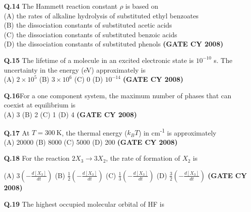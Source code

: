 \documentclass[12pt]{article}
\begin{document}
\begin{enumerate}
    \vspace{0.5cm}

    \textbf{Q.14} The Hammett reaction constant $\rho$ is based on\\
    (A) the rates of alkaline hydrolysis of substituted ethyl benzoates\\
    (B) the dissociation constants of substituted acetic acids\\
    (C) the dissociation constants of substituted benzoic acids\\
    (D) the dissociation constants of substituted phenols   \textbf{(GATE CY 2008)}


    \vspace{0.5cm}

    \textbf{Q.15} The lifetime of a molecule in an excited electronic state is $10^{-10}$ s. The uncertainty in the energy (eV) approximately is\\
    (A) $2 \times 10^5$ \quad (B) $3 \times 10^6$ \quad (C) 0 \quad (D) $10^{-14}$   \textbf{(GATE CY 2008)}


    \vspace{0.5cm}

    \textbf{Q.16}For a one component system, the maximum number of phases that can coexist at equilibrium is\\
    (A) 3 \quad (B) 2 \quad (C) 1 \quad (D) 4   \textbf{(GATE CY 2008)}


    \vspace{0.5cm}

    \textbf{Q.17} At $T = 300 \ \mathrm{K}$, the thermal energy ($k_B T$) in cm\textsuperscript{-1} is approximately\\
    (A) 20000 \quad (B) 8000 \quad (C) 5000 \quad (D) 200   \textbf{(GATE CY 2008)}


    \vspace{0.5cm}

    \textbf{Q.18} For the reaction $2 X_3 \rightarrow 3 X_2$, the rate of formation of $X_2$ is

(A) $3 \left(-\frac{d[X_3]}{dt}\right)$ \hspace{1cm}
(B) $\frac{1}{2} \left(-\frac{d[X_3]}{dt}\right)$ \hspace{1cm}
(C) $\frac{1}{3} \left(-\frac{d[X_3]}{dt}\right)$ \hspace{1cm}
(D) $\frac{3}{2} \left(-\frac{d[X_3]}{dt}\right)$   \textbf{(GATE CY 2008)}


\vspace{0.5cm}

\textbf{Q.19} The highest occupied molecular orbital of HF is


\end{enumerate}
\end{document}
